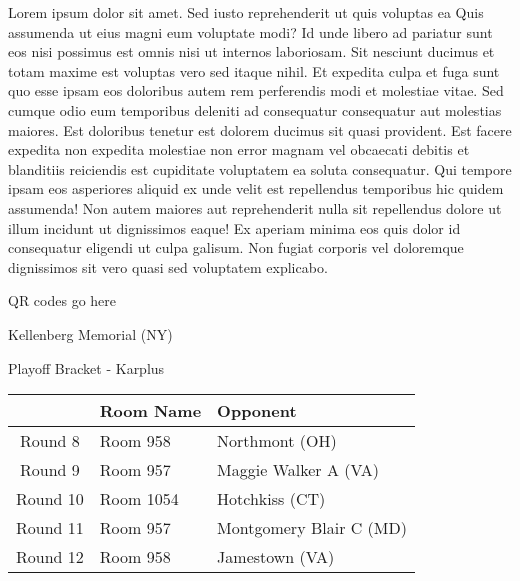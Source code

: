\documentclass{article}%
\begin{document}
\vspace*{8pt}%
\linebreak%
\newline%
\newline%
Lorem ipsum dolor sit amet. Sed iusto reprehenderit ut quis voluptas ea Quis assumenda ut eius magni eum voluptate modi? Id unde libero ad pariatur sunt eos nisi possimus est omnis nisi ut internos laboriosam. Sit nesciunt ducimus et totam maxime est voluptas vero sed itaque nihil. Et expedita culpa et fuga sunt quo esse ipsam eos doloribus autem rem perferendis modi et molestiae vitae.\newline%
\newline%
Sed cumque odio eum temporibus deleniti ad consequatur consequatur aut molestias maiores. Est doloribus tenetur est dolorem ducimus sit quasi provident. Est facere expedita non expedita molestiae non error magnam vel obcaecati debitis et blanditiis reiciendis est cupiditate voluptatem ea soluta consequatur. Qui tempore ipsam eos asperiores aliquid ex unde velit est repellendus temporibus hic quidem assumenda!\newline%
\newline%
Non autem maiores aut reprehenderit nulla sit repellendus dolore ut illum incidunt ut dignissimos eaque! Ex aperiam minima eos quis dolor id consequatur eligendi ut culpa galisum. Non fugiat corporis vel doloremque dignissimos sit vero quasi sed voluptatem explicabo.\newline%
\newline%
%
\vspace*{30pt}%
\begin{center}%
\begin{Huge}%
QR codes go here%
\end{Huge}%
\end{center}%
\newpage%
\begin{center}%
\begin{Huge}%
Kellenberg Memorial (NY)%
\end{Huge}%
\vspace*{8pt}%
\linebreak%
\begin{Large}%
Playoff Bracket {-} Karplus%
\end{Large}%
\end{center}%
%
\begin{tabularx}{\textwidth}{|c|Y|Y|}%
\hline%
&Room Name&Opponent\\%
\hline%
Round 8&Room 958&Northmont (OH)\\%
Round 9&Room 957&Maggie Walker A (VA)\\%
Round 10&Room 1054&Hotchkiss (CT)\\%
Round 11&Room 957&Montgomery Blair C (MD)\\%
Round 12&Room 958&Jamestown (VA)\\%
\hline%
\end{tabularx}%
\end{document}
